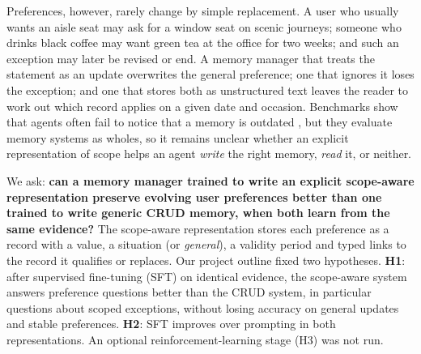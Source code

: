 \documentclass[11pt]{article}
\begin{document}
Preferences, however, rarely change by simple replacement. A user who usually wants an aisle seat may ask for a window seat on scenic journeys; someone who drinks black coffee may want green tea at the office for two weeks; and such an exception may later be revised or end. A memory manager that treats the statement as an update overwrites the general preference; one that ignores it loses the exception; and one that stores both as unstructured text leaves the reader to work out which record applies on a given date and occasion. Benchmarks show that agents often fail to notice that a memory is outdated \citep{chao2026stale,li2026horizonbench}, but they evaluate memory systems as wholes, so it remains unclear whether an explicit representation of scope helps an agent \emph{write} the right memory, \emph{read} it, or neither.

We ask: \textbf{can a memory manager trained to write an explicit scope-aware representation preserve evolving user preferences better than one trained to write generic CRUD memory, when both learn from the same evidence?} The scope-aware representation stores each preference as a record with a value, a situation (or \emph{general}), a validity period and typed links to the record it qualifies or replaces. Our project outline fixed two hypotheses. \textbf{H1}: after supervised fine-tuning (SFT) on identical evidence, the scope-aware system answers preference questions better than the CRUD system, in particular questions about scoped exceptions, without losing accuracy on general updates and stable preferences. \textbf{H2}: SFT improves over prompting in both representations. An optional reinforcement-learning stage (H3) was not run.
\end{document}
